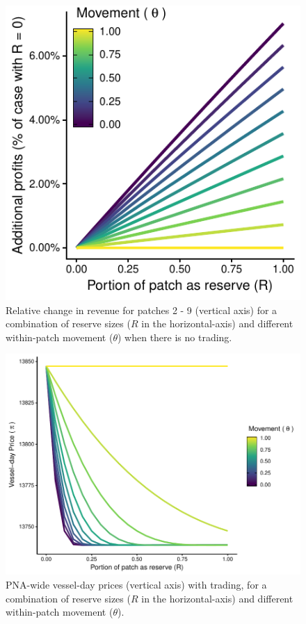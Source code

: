 \documentclass[12pt]{article}
\begin{document}
\begin{figure}[htbp]
\centering
\includegraphics{img/profits_PNA_notKIR_no_trading_plot.pdf}
\caption{\label{fig:profits_PNA_notKIR_no_trading_plot}Relative change in revenue for patches 2 - 9 (vertical axis) for a combination of reserve sizes ($R$ in the horizontal-axis) and different within-patch movement ($\theta$) when there is no trading.}
\end{figure}

\begin{figure}
\centering
\includegraphics{img/vessel_day_price_with_trading_plot.pdf}
\caption{\label{fig:vessel_day_price_with_trading_plot}PNA-wide vessel-day prices (vertical axis) with trading, for a combination of reserve sizes ($R$ in the horizontal-axis) and different within-patch movement ($\theta$).}
\end{figure}
\end{document}
